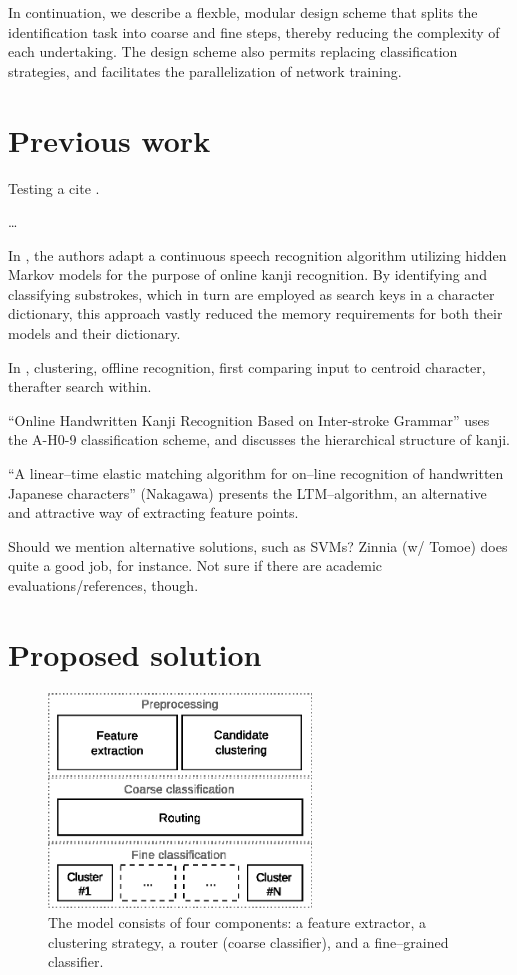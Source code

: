 \documentclass[10pt,conference,a4paper]{IEEEtran}
\begin{document}
	In continuation, we describe a flexble, modular design scheme that splits the identification task into coarse and fine steps,
	thereby reducing the complexity of each undertaking. The design scheme also permits replacing classification strategies,
	and facilitates the parallelization of network training.


	 
	\section{Previous work}
	\label{sec:previous_work}

	Testing a cite \cite{zhu2014robust}.

	\ldots

	In \cite{nakai2001substroke}, the authors adapt a continuous speech recognition algorithm utilizing
	hidden Markov models for the purpose of online kanji recognition. By identifying and classifying
	substrokes, which in turn are employed as search keys in a character dictionary, this approach vastly
	reduced the memory requirements for both their models and their dictionary.

	
	In \cite{yang2003accelerating}, clustering, offline recognition, first comparing input to centroid character,
	therafter search within.


	``Online Handwritten Kanji Recognition Based on Inter-stroke Grammar'' uses the A-H0-9 classification scheme,
	and discusses the hierarchical structure of kanji.

	``A linear--time elastic matching algorithm for on--line recognition of handwritten Japanese characters'' (Nakagawa)
	presents the LTM--algorithm, an alternative and attractive way of extracting feature points.

	Should we mention alternative solutions, such as SVMs? Zinnia (w/ Tomoe) does quite a good job, for instance. Not sure if there
	are academic evaluations/references, though.



	\section{Proposed solution}
	\label{sec:proposed_solution}

	\begin{figure}
		\centering
		\includegraphics[width=2.75in]{./fig/model-overview.eps}
		\caption{The model consists of four components: a feature extractor, a clustering strategy,
			a router (coarse classifier), and a fine--grained classifier.}
		\label{fig_model_overview}
	\end{figure}
\end{document}
